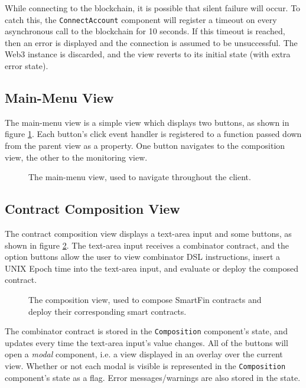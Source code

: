 While connecting to the blockchain, it is possible that silent failure will occur. To catch this, the \texttt{ConnectAccount} component will register a timeout on every asynchronous call to the blockchain for 10 seconds. If this timeout is reached, then an error is displayed and the connection is assumed to be unsuccessful. The Web3 instance is discarded, and the view reverts to its initial state (with extra error state).


\subsection{Main-Menu View}

The main-menu view is a simple view which displays two buttons, as shown in figure \ref{fig:main-menu}. Each button's click event handler is registered to a function passed down from the parent view as a property. One button navigates to the composition view, the other to the monitoring view. \\

\begin{figure}[h]
    \centering
    \caption{The main-menu view, used to navigate throughout the client.}
    \label{fig:main-menu}
\end{figure}


\subsection{Contract Composition View}

The contract composition view displays a text-area input and some buttons, as shown in figure \ref{fig:composition}. The text-area input receives a combinator contract, and the option buttons allow the user to view combinator DSL instructions, insert a UNIX Epoch time into the text-area input, and evaluate or deploy the composed contract. \\

\begin{figure}[h]
    \centering
    \caption{The composition view, used to compose SmartFin contracts and deploy their corresponding smart contracts.}
    \label{fig:composition}
\end{figure}

The combinator contract is stored in the \texttt{Composition} component's state, and updates every time the text-area input's value changes. All of the buttons will open a \textit{modal} component, i.e. a view displayed in an overlay over the current view. Whether or not each modal is visible is represented in the \texttt{Composition} component's state as a flag. Error messages/warnings are also stored in the state. \\

